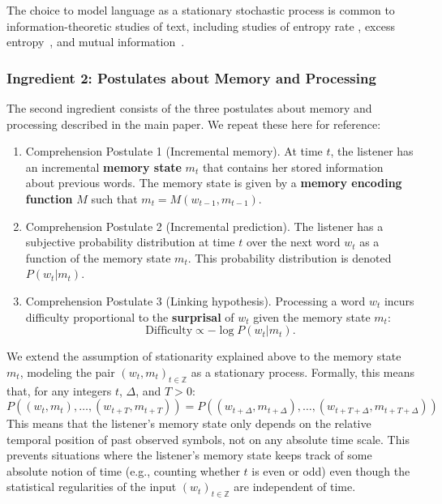 \documentclass[11pt,letterpaper]{article}
\newcommand{\key}[1]{\textbf{#1}}
\begin{document}
The choice to model language as a stationary stochastic process is common to information-theoretic studies of text, including studies of entropy rate \citep{shannon1951entropy,bentz2017entropy,takahashi2018cross}, excess entropy~\citep{debowski-excess-2011,hahn2019estimating}, and mutual information~\citep{ebeling-entropy-1994,lin-critical-2017}.

\subsubsection{Ingredient 2: Postulates about Memory and Processing}
The second ingredient consists of the three postulates about memory and processing described in the main paper.
We repeat these here for reference:
\begin{enumerate}
    \item Comprehension Postulate 1 (Incremental memory). At time $t$, the listener has an incremental \key{memory state} $m_t$ that contains her stored information about previous words. The memory state is given by a \key{memory encoding function} $M$ such that $m_t = M(w_{t-1}, m_{t-1})$.
    \item Comprehension Postulate 2 (Incremental prediction). The listener has a subjective probability distribution at time $t$ over the next word $w_t$ as a function of the memory state $m_t$. This probability distribution is denoted $P(w_t|m_t)$.
    \item Comprehension Postulate 3 (Linking hypothesis). Processing a word $w_t$ incurs difficulty proportional to the \key{surprisal} of $w_t$ given the memory state $m_t$:
    \begin{equation}
    \label{eq:lossy-surp}
    \text{Difficulty} \propto -\log P(w_t | m_t).
\end{equation}
\end{enumerate}
We extend the assumption of stationarity explained above to the memory state $m_t$, modeling the pair $(w_t, m_t)_{t \in \mathbb{Z}}$ as a stationary process.
Formally, this means that, for any integers $t$, $\Delta$, and $T>0$:
\begin{equation}
	P((w_t, m_t), \dots, (w_{t+T}, m_{t+T})) = 	P((w_{t+\Delta}, m_{t+\Delta}), \dots, (w_{t+T+\Delta}, m_{t+T+\Delta}))
\end{equation}
This means that the listener's memory state only depends on the relative temporal position of past observed symbols, not on any absolute time scale.
This prevents situations where the listener's memory state keeps track of some absolute notion of time (e.g., counting whether $t$ is even or odd) even though the statistical regularities of the input $(w_t)_{t \in \mathbb{Z}}$ are independent of time.
\end{document}
